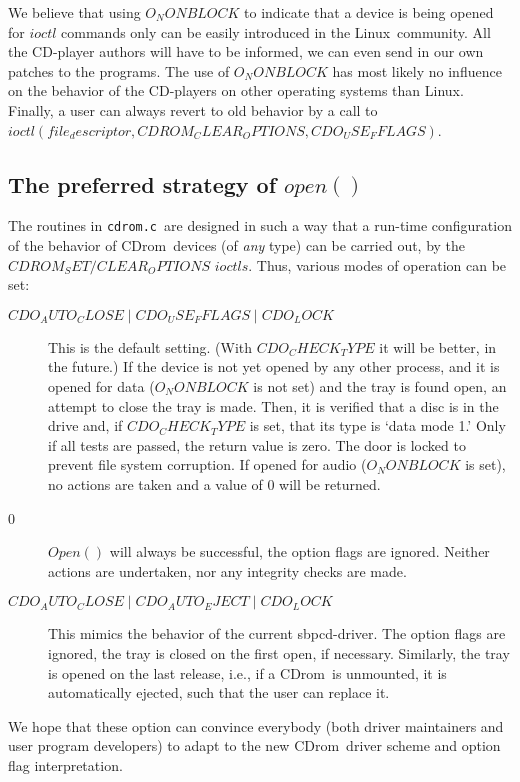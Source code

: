\documentclass{article}
\def\linux{{\sc Linux}}
\def\cdrom{{\sc CDrom}}
\def\cdromc{{\tt cdrom.c}}
\begin{document}
We believe that using $O_NONBLOCK$ to indicate that a device is being opened
for $ioctl$ commands only can be easily introduced in the \linux\
community. All the CD-player authors will have to be informed, we can
even send in our own patches to the programs. The use of $O_NONBLOCK$
has most likely no influence on the behavior of the CD-players on
other operating systems than \linux. Finally, a user can always revert
to old behavior by a call to $ioctl(file_descriptor, CDROM_CLEAR_OPTIONS,
CDO_USE_FFLAGS)$. 

\subsection{The preferred strategy of $open()$}

The routines in \cdromc\ are designed in such a way that a run-time
configuration of the behavior of \cdrom\ devices (of {\em any\/} type)
can be carried out, by the $CDROM_SET/CLEAR_OPTIONS$ $ioctls$. Thus, various
modes of operation can be set:
\begin{description}
\item[$CDO_AUTO_CLOSE \mathrel| CDO_USE_FFLAGS \mathrel| CDO_LOCK$]
This is the default setting. (With $CDO_CHECK_TYPE$ it will be better,
in the future.) If the device is not yet opened by any other process,
and it is opened for data ($O_NONBLOCK$ is not set) and the tray is
found open, an attempt to close the tray is made. Then, it is verified
that a disc is in the drive and, if $CDO_CHECK_TYPE$ is set, that its
type is `data mode 1.' Only if all tests are passed, the return value
is zero. The door is locked to prevent file system corruption. If
opened for audio ($O_NONBLOCK$ is set), no actions are taken and a
value of 0 will be returned.
\item[0] $Open()$ will always be successful, the option flags are
ignored. Neither actions are undertaken, nor any integrity checks are
made. 
\item[$CDO_AUTO_CLOSE \mathrel| CDO_AUTO_EJECT \mathrel| CDO_LOCK$]
This mimics the behavior of the current sbpcd-driver. The option flags
are ignored, the tray is closed on the first open, if
necessary. Similarly, the tray is opened on the last release, i.e., if
a \cdrom\ is unmounted, it is automatically ejected, such that the
user can replace it. 
\end{description}
We hope that these option can convince everybody (both driver
maintainers and user program developers) to adapt to the new \cdrom\
driver scheme and option flag interpretation. 
\end{document}

